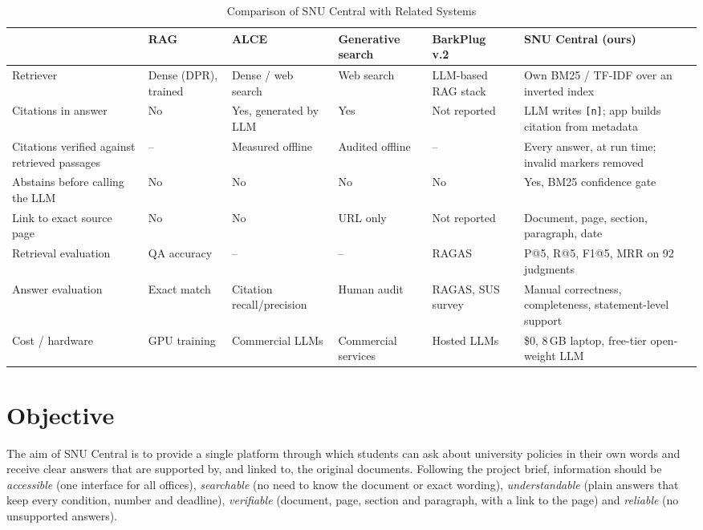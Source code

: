 \documentclass[conference]{IEEEtran}
\newcommand{\code}[1]{\texttt{#1}}
\begin{document}
\begin{table}[t]
\caption{Comparison of SNU Central with Related Systems}
\label{tab:related}
\centering
\footnotesize
\begin{tabularx}{\textwidth}{@{}L{3.0cm}YYYYY@{}}
\toprule
 & \textbf{RAG}~\cite{lewis2020rag} & \textbf{ALCE}~\cite{gao2023alce} & \textbf{Generative search}~\cite{liu2023verifiability} & \textbf{BarkPlug v.2}~\cite{neupane2024barkplug} & \textbf{SNU Central (ours)} \\
\midrule
Retriever & Dense (DPR), trained & Dense / web search & Web search & LLM-based RAG stack & Own BM25 / TF-IDF over an inverted index \\
Citations in answer & No & Yes, generated by LLM & Yes & Not reported & LLM writes \code{[n]}; app builds citation from metadata \\
Citations verified against retrieved passages & -- & Measured offline & Audited offline & -- & Every answer, at run time; invalid markers removed \\
Abstains before calling the LLM & No & No & No & No & Yes, BM25 confidence gate \\
Link to exact source page & No & No & URL only & Not reported & Document, page, section, paragraph, date \\
Retrieval evaluation & QA accuracy & -- & -- & RAGAS & P@5, R@5, F1@5, MRR on 92 judgments \\
Answer evaluation & Exact match & Citation recall/precision & Human audit & RAGAS, SUS survey & Manual correctness, completeness, statement-level support \\
Cost / hardware & GPU training & Commercial LLMs & Commercial services & Hosted LLMs & \$0, 8\,GB laptop, free-tier open-weight LLM \\
\bottomrule
\end{tabularx}
\end{table}

\section{Objective}\label{sec:objective}

The aim of SNU Central is to provide a single platform through which students can ask about university policies in their own words and receive clear answers that are supported by, and linked to, the original documents. Following the project brief, information should be \emph{accessible} (one interface for all offices), \emph{searchable} (no need to know the document or exact wording), \emph{understandable} (plain answers that keep every condition, number and deadline), \emph{verifiable} (document, page, section and paragraph, with a link to the page) and \emph{reliable} (no unsupported answers).
\end{document}
